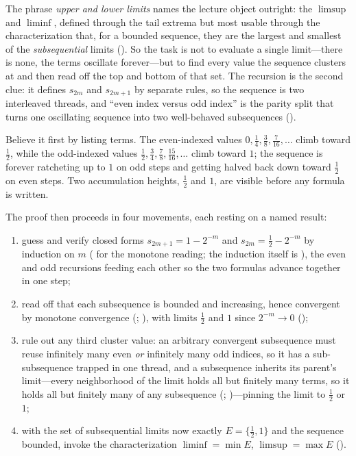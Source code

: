 \documentclass[main.tex]{subfiles}
\begin{document}
\begin{Reflection}
The phrase \emph{upper and lower limits} names the lecture object outright: the $\limsup$ and
$\liminf$, defined through the tail extrema but most usable through the characterization that, for a
bounded sequence, they are the largest and smallest of the \emph{subsequential} limits
(). So the task is not to evaluate a single limit---there is none, the terms oscillate
forever---but to find every value the sequence clusters at and then read off the top and bottom of
that set. The recursion is the second clue: it defines $s_{2m}$ and $s_{2m+1}$ by separate rules, so
the sequence is two interleaved threads, and ``even index versus odd index'' is the parity split
that turns one oscillating sequence into two well-behaved subsequences ().

Believe it first by listing terms. The even-indexed values $0,\tfrac14,\tfrac38,\tfrac7{16},\dots$
climb toward $\tfrac12$, while the odd-indexed values $\tfrac12,\tfrac34,\tfrac78,\tfrac{15}{16},
\dots$ climb toward $1$; the sequence is forever ratcheting up to $1$ on odd steps and getting
halved back down toward $\tfrac12$ on even steps. Two accumulation heights, $\tfrac12$ and $1$, are
visible before any formula is written.

The proof then proceeds in four movements, each resting on a named result:
\begin{enumerate}[leftmargin=1.7em,itemsep=3pt,topsep=2pt,label=\textnormal{(\arabic*)}]
  \item guess and verify closed forms $s_{2m+1}=1-2^{-m}$ and $s_{2m}=\tfrac12-2^{-m}$ by induction
        on $m$ ( for the monotone reading; the induction itself is ), the
        even and odd recursions feeding each other so the two formulas advance together in one step;
  \item read off that each subsequence is bounded and increasing, hence convergent by monotone
        convergence (; ),
        with limits $\tfrac12$ and $1$ since $2^{-m}\to0$ ();
  \item rule out any third cluster value: an arbitrary convergent subsequence must reuse infinitely
        many even \emph{or} infinitely many odd indices, so it has a sub-subsequence trapped in one
        thread, and a subsequence inherits its parent's limit---every neighborhood of the limit
        holds all but finitely many terms, so it holds all but finitely many of any subsequence
        (; )---pinning the limit to $\tfrac12$ or
        $1$;
  \item with the set of subsequential limits now exactly $E=\{\tfrac12,1\}$ and the sequence bounded,
        invoke the characterization $\liminf=\min E$, $\limsup=\max E$ ().
\end{enumerate}


\end{Reflection}
\end{document}
